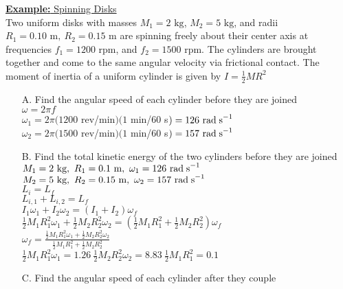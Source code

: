 \documentclass[a4paper]{article}
\let\bf\textbf
\newcommand\rads{\text{ rad\;s}^{-1}}
\newcommand\m{\text{ m}}
\newcommand\kg{\text{ kg}}
\begin{document}
\begin{shaded}
    \underline{\bf{Example:} Spinning Disks}
    \vspace{2mm}\\
    Two uniform disks with masses $M_1 = 2\kg$, $M_2 = 5\kg$, and radii $R_1 = 0.10\m,\ R_2 = 0.15\m$ are spinning freely about their center axis at frequencies $f_1 = 1200$ rpm, and $f_2 = 1500$ rpm. The cylinders are brought together and come to the same angular velocity via frictional contact. The moment of inertia of a uniform cylinder is given by $I = \frac{1}{2}MR^2$
    \begin{enumerate}
        \item[A.] Find the angular speed of each cylinder before they are joined\\
        $\omega = 2\pi f$\\
        $\omega_1 = 2\pi(1200$ rev/min$)(1$ min/60 s$) = 126\rads$\\
        $\omega_2 = 2\pi(1500$ rev/min$)(1$ min/60 s$) = 157\rads$
        \item[B.] Find the total kinetic energy of the two cylinders before they are joined\\
        $M_1 = 2\kg,\ R_1 = 0.1\m,\ \omega_1 = 126\rads$ $M_2 = 5\kg,\ R_2 = 0.15\m,\ \omega_2 = 157\rads$\\
        $L_i = L_f$\\
        $L_{i,1} + L_{i,2} = L_f$\\
        $I_1\omega_1 + I_2\omega_2 = (I_1 + I_2)\omega_f$\\
        $\frac{1}{2}M_1R_1^2\omega_1 + \frac{1}{2}M_2R_2^2\omega_2 = (\frac{1}{2}M_1R_1^2 + \frac{1}{2}M_2R_2^2)\omega_f$\\
        $\omega_f = \frac{\frac{1}{2}M_1R_1^2\omega_1 + \frac{1}{2}M_2R_2^2\omega_2}{\frac{1}{2}M_1R_1^2 + \frac{1}{2}M_2R_2^2}$\\
        $\frac{1}{2}M_1R_1^2\omega_1 = 1.26\ \frac{1}{2}M_2R_2^2\omega_2 = 8.83\ \frac{1}{2}M_1R_1^2 = 0.1$
        \item[C.] Find the angular speed of each cylinder after they couple
    \end{enumerate}
\end{shaded}

\newpage
\end{document}
